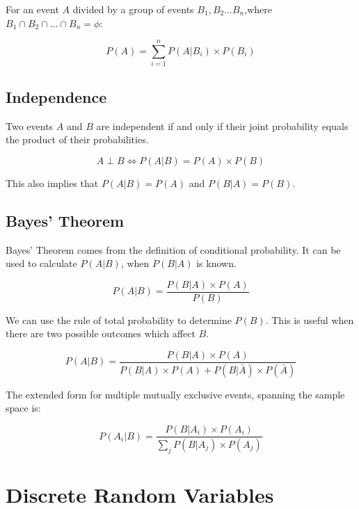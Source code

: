 \documentclass[a4paper, 10pt]{article}
\begin{document}
	\noindent For an event \(A\) divided by a group of events \(B_{1}, B_{2}\ldots B_{n}\),\newline where \(B_{1}\cap B_{2}\cap \ldots \cap B_{n}=\phi\):

	\begin{equation*}
		P(A)=\displaystyle \sum_{i=1}^{n}P(A|B_{i})\times P(B_{i})
	\end{equation*}

		\subsection{Independence}

		Two events \(A\) and \(B\) are independent if and only if their joint probability equals the product of their probabilities.

		\begin{equation*}
			A\perp B\Leftrightarrow P(A|B) = P(A)\times P(B)
		\end{equation*}

		\noindent This also implies that \(P(A|B)=P(A)\) and \(P(B|A)=P(B)\).

	\subsection{Bayes' Theorem}

	Bayes' Theorem comes from the definition of conditional probability. It can be used to calculate \(P(A|B)\), when \(P(B|A)\) is known.

	\begin{equation*}
		P(A|B)=\frac{P(B|A)\times P(A)}{P(B)}
	\end{equation*}

	\noindent We can use the rule of total probability to determine \(P(B)\). This is useful when there are two possible outcomes which affect \(B\).

	\begin{equation*}
		P(A|B)=\frac{P(B|A)\times P(A)}{P(B|A)\times P(A) + P(B|\bar{A})\times P(\bar{A})}
	\end{equation*}

	\noindent The extended form for multiple mutually exclusive events, spanning the sample space is:

	\begin{equation*}
		P(A_{i}|B) = \frac{P(B|A_{i})\times P(A_{i})}{\sum_{j}^{} P(B|A_{j})\times P(A_{j})}
	\end{equation*}

	\newpage
	\section{Discrete Random Variables}
\end{document}
